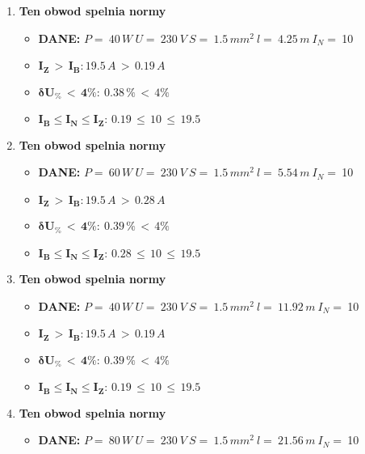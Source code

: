 \begin{enumerate}
\item \textcolor{Green}{\cmark} \textbf{Ten obwod spelnia normy} 
\begin{itemize}
\item[] \textbf{DANE: } \: $ P = \:40\, W\: U = \:230\: V\: S = \:1.5\, mm^2\: l = \:4.25\, m\: I_N= \: $10
\item[\textcolor{Green}{\cmark}] $ \pmb{I_Z \, >  \, I_B: }19.5 \, A \, > \,0.19 \, A $
\item[\textcolor{Green}{\cmark}] $ \pmb{ \delta U_\% \, < \, 4\%:} \:0.38 \, \% \,< \, 4\% $
\item[\textcolor{Green}{\cmark}] $ \pmb{I_B \le I_N \le I_Z: } \, 0.19 \, \le \,10 \, \le \,19.5 $
\end{itemize}
\item \textcolor{Green}{\cmark} \textbf{Ten obwod spelnia normy} 
\begin{itemize}
\item[] \textbf{DANE: } \: $ P = \:60\, W\: U = \:230\: V\: S = \:1.5\, mm^2\: l = \:5.54\, m\: I_N= \: $10
\item[\textcolor{Green}{\cmark}] $ \pmb{I_Z \, >  \, I_B: }19.5 \, A \, > \,0.28 \, A $
\item[\textcolor{Green}{\cmark}] $ \pmb{ \delta U_\% \, < \, 4\%:} \:0.39 \, \% \,< \, 4\% $
\item[\textcolor{Green}{\cmark}] $ \pmb{I_B \le I_N \le I_Z: } \, 0.28 \, \le \,10 \, \le \,19.5 $
\end{itemize}
\item \textcolor{Green}{\cmark} \textbf{Ten obwod spelnia normy} 
\begin{itemize}
\item[] \textbf{DANE: } \: $ P = \:40\, W\: U = \:230\: V\: S = \:1.5\, mm^2\: l = \:11.92\, m\: I_N= \: $10
\item[\textcolor{Green}{\cmark}] $ \pmb{I_Z \, >  \, I_B: }19.5 \, A \, > \,0.19 \, A $
\item[\textcolor{Green}{\cmark}] $ \pmb{ \delta U_\% \, < \, 4\%:} \:0.39 \, \% \,< \, 4\% $
\item[\textcolor{Green}{\cmark}] $ \pmb{I_B \le I_N \le I_Z: } \, 0.19 \, \le \,10 \, \le \,19.5 $
\end{itemize}
\item \textcolor{Green}{\cmark} \textbf{Ten obwod spelnia normy} 
\begin{itemize}
\item[] \textbf{DANE: } \: $ P = \:80\, W\: U = \:230\: V\: S = \:1.5\, mm^2\: l = \:21.56\, m\: I_N= \: $10

\end{itemize}
\end{enumerate}
